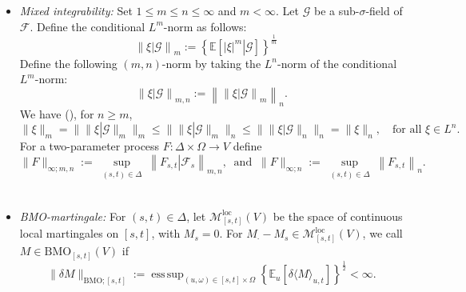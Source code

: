 \documentclass[11pt,reqno]{amsart}
\DeclareMathOperator*{\esssup}{ess\,sup}
\numberwithin{equation}{section}
\def\E{\mathbb E}
\begin{document}
\begin{itemize}[leftmargin=1.2em, labelsep=0.2em]
Denote by $\mathcal H^{k,\infty}([s,t])$ the space of progressively measurable processes $S$ such that  
\begin{equation*}
\|S\|_{\mathcal H^{k,\infty};[s,t]} := \left\{ \left\| \E_{\bm\cdot}\left[\|S\|^k_{L^{k}([\bm\cdot,t])}\right] \right\|_{\mathcal L^{\infty}([s,t]\times\Omega)} \right\}^{\frac{1}{k}} < \infty. 
\end{equation*}



\

\item {\it Mixed integrability:} Set $1\le m\le n\le \infty$ and $m<\infty$. Let $\mathcal G$ be a sub-$\sigma$-field of $\mathcal F$. Define the conditional $L^m$-norm as follows: 
\begin{equation*}
\left\|\left. \xi \right|\mathcal G\right\|_{m} := \left\{\E\left[\left.|\xi|^{m}\right|\mathcal G\right]\right\}^{\frac{1}{m}}\quad \end{equation*}
Define the following $(m,n)$-norm by taking the $L^n$-norm of the conditional $L^m$-norm:
\begin{equation}\label{e:mixed moment}
\left\|\left.\xi \right|\mathcal G\right\|_{m,n} := \left\| \left\|\left. \xi \right|\mathcal G\right\|_{m} \right\|_{n}.
\end{equation}
We have (\cite[Proposition~2.3]{fhl21}), for $n\ge m$,
\[ \|\xi\|_m =\| \|\xi |\mathcal G\|_m\|_m \le \|\|\xi |\mathcal G\|_m\|_n\le \|\|\xi |\mathcal G\|_n\|_n=\|\xi \|_n, \quad \text{for all } \xi \in L^n.\]
For a two-parameter process  $F:\Delta\times \Omega\to V$ define
\begin{equation*}
\|F\|_{\infty;m,n} := \sup_{\substack{(s,t)\in\Delta}} \left\|\left. F_{s,t} \right|\mathcal F_{s}\right\|_{m,n},\ \text{ and }\ \|F\|_{\infty;n} :=\sup_{\substack{(s,t)\in\Delta}} \left\| F_{s,t} \right\|_{n}.
\end{equation*}
\ \ 

\item {\it \emph{BMO}-martingale:}  
For $(s,t)\in\Delta$, let $\mathcal M^{\text{loc}}_{[s,t]}(V)$ be the space of continuous local martingales on $[s,t]$, with $M_{s} = 0$. For $M_{\bm\cdot} - M_{s}\in \mathcal M^{\text{loc}}_{[s,t]}(V)$, we call $M\in \text{BMO}_{[s,t]}(V)$ if 
\begin{equation*}
\|\delta M\|_{\mathrm{BMO};[s,t]}:=\esssup_{(u,\omega)\in[s,t]\times \Omega}\left\{\E_{u}\left[\delta \langle M \rangle_{u,t} \right]\right\}^{\frac{1}{2}}<\infty.
\end{equation*}


\end{itemize}
\end{document}
